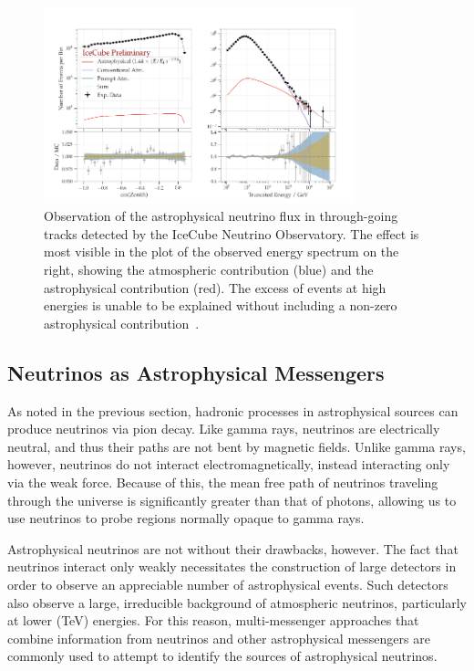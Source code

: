\begin{figure}[h]
\centering
\includegraphics[width=0.8\textwidth]{figs/northerntracks_diffusefit.png}
\caption{Observation of the astrophysical neutrino flux in through-going tracks detected by the IceCube Neutrino Observatory. The effect is most visible in the plot of the observed energy spectrum on the right, showing the atmospheric contribution (blue) and the astrophysical contribution (red). The excess of events at high energies is unable to be explained without including a non-zero astrophysical contribution~\cite{stettner2019measurement}. }
\label{fig:diffusefit}
\end{figure}

\subsection{Neutrinos as Astrophysical Messengers}
As noted in the previous section, hadronic processes in astrophysical sources can produce neutrinos via pion decay. Like gamma rays, neutrinos are electrically neutral, and thus their paths are not bent by magnetic fields. Unlike gamma rays, however, neutrinos do not interact electromagnetically, instead interacting only via the weak force. Because of this, the mean free path of neutrinos traveling through the universe is significantly greater than that of photons, allowing us to use neutrinos to probe regions normally opaque to gamma rays. 

Astrophysical neutrinos are not without their drawbacks, however. The fact that neutrinos interact only weakly necessitates the construction of large detectors in order to observe an appreciable number of astrophysical events. Such detectors also observe a large, irreducible background of atmospheric neutrinos, particularly at lower (TeV) energies. For this reason, multi-messenger approaches that combine information from neutrinos and other astrophysical messengers are commonly used to attempt to identify the sources of astrophysical neutrinos. 


